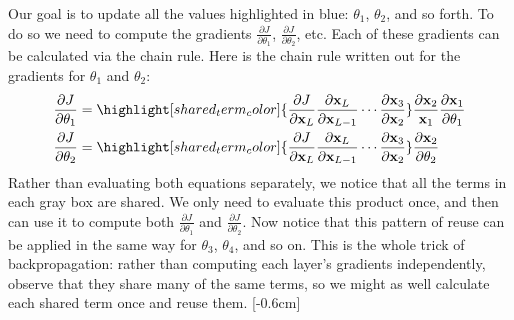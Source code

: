 Our goal is to update all the values highlighted in blue: $\theta_1$, $\theta_2$, and so forth. To do so we need to compute the gradients $\frac{\partial J}{\partial \theta_1}$, $\frac{\partial J}{\partial \theta_2}$, etc. Each of these gradients can be calculated via the chain rule. Here is the chain rule written out for the gradients for $\theta_1$ and $\theta_2$:
\begin{align}
    \frac{\partial J}{\partial \theta_1} & = \highlight[shared_term_color]{\frac{\partial J}{\partial \mathbf{x}_L}\frac{\partial \mathbf{x}_L}{\partial \mathbf{x}_{L-1}} \cdots \frac{\partial \mathbf{x}_3}{\partial \mathbf{x}_2}} \frac{\partial \mathbf{x}_2}{\mathbf{x}_1}\frac{\partial \mathbf{x}_1}{\partial \mathbf{\theta}_1} \\
    \frac{\partial J}{\partial \theta_2} & =  \highlight[shared_term_color]{\frac{\partial J}{\partial \mathbf{x}_{L}}\frac{\partial \mathbf{x}_L}{\partial \mathbf{x}_{L-1}} \cdots \frac{\partial \mathbf{x}_3}{\partial \mathbf{x}_2}} \frac{\partial \mathbf{x}_2}{\partial \theta_2}
\end{align}
Rather than evaluating both equations separately, we notice that all the terms in each gray box are shared. We only need to evaluate this product once, and then can use it to compute both $\frac{\partial J}{\partial \theta_1}$ and $\frac{\partial J}{\partial \theta_2}$. Now notice that this pattern of reuse can be applied in the same way for $\theta_3$, $\theta_4$, and so on. This is the whole trick of backpropagation: rather than computing each layer's gradients independently, observe that they share many of the same terms, so we might as well calculate each shared term once and reuse them. [-0.6cm]

